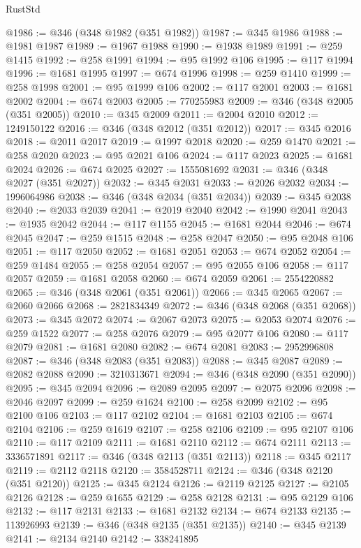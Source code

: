 \begin{lexlean}{RustStd}
\begin{coremodule}
@1986 := @346 (@348 @1982 (@351 @1982))
@1987 := @345 @1986
@1988 := @1981 @1987
@1989 := @1967 @1988
@1990 := @1938 @1989
@1991 := @259 @1415
@1992 := @258 @1991
@1994 := @95 @1992 @106
@1995 := @117 @1994
@1996 := @1681 @1995
@1997 := @674 @1996
@1998 := @259 @1410
@1999 := @258 @1998
@2001 := @95 @1999 @106
@2002 := @117 @2001
@2003 := @1681 @2002
@2004 := @674 @2003
@2005 := 770255983
@2009 := @346 (@348 @2005 (@351 @2005))
@2010 := @345 @2009
@2011 := @2004 @2010
@2012 := 1249150122
@2016 := @346 (@348 @2012 (@351 @2012))
@2017 := @345 @2016
@2018 := @2011 @2017
@2019 := @1997 @2018
@2020 := @259 @1470
@2021 := @258 @2020
@2023 := @95 @2021 @106
@2024 := @117 @2023
@2025 := @1681 @2024
@2026 := @674 @2025
@2027 := 1555081692
@2031 := @346 (@348 @2027 (@351 @2027))
@2032 := @345 @2031
@2033 := @2026 @2032
@2034 := 1996064986
@2038 := @346 (@348 @2034 (@351 @2034))
@2039 := @345 @2038
@2040 := @2033 @2039
@2041 := @2019 @2040
@2042 := @1990 @2041
@2043 := @1935 @2042
@2044 := @117 @1155
@2045 := @1681 @2044
@2046 := @674 @2045
@2047 := @259 @1515
@2048 := @258 @2047
@2050 := @95 @2048 @106
@2051 := @117 @2050
@2052 := @1681 @2051
@2053 := @674 @2052
@2054 := @259 @1484
@2055 := @258 @2054
@2057 := @95 @2055 @106
@2058 := @117 @2057
@2059 := @1681 @2058
@2060 := @674 @2059
@2061 := 2554220882
@2065 := @346 (@348 @2061 (@351 @2061))
@2066 := @345 @2065
@2067 := @2060 @2066
@2068 := 2821834349
@2072 := @346 (@348 @2068 (@351 @2068))
@2073 := @345 @2072
@2074 := @2067 @2073
@2075 := @2053 @2074
@2076 := @259 @1522
@2077 := @258 @2076
@2079 := @95 @2077 @106
@2080 := @117 @2079
@2081 := @1681 @2080
@2082 := @674 @2081
@2083 := 2952996808
@2087 := @346 (@348 @2083 (@351 @2083))
@2088 := @345 @2087
@2089 := @2082 @2088
@2090 := 3210313671
@2094 := @346 (@348 @2090 (@351 @2090))
@2095 := @345 @2094
@2096 := @2089 @2095
@2097 := @2075 @2096
@2098 := @2046 @2097
@2099 := @259 @1624
@2100 := @258 @2099
@2102 := @95 @2100 @106
@2103 := @117 @2102
@2104 := @1681 @2103
@2105 := @674 @2104
@2106 := @259 @1619
@2107 := @258 @2106
@2109 := @95 @2107 @106
@2110 := @117 @2109
@2111 := @1681 @2110
@2112 := @674 @2111
@2113 := 3336571891
@2117 := @346 (@348 @2113 (@351 @2113))
@2118 := @345 @2117
@2119 := @2112 @2118
@2120 := 3584528711
@2124 := @346 (@348 @2120 (@351 @2120))
@2125 := @345 @2124
@2126 := @2119 @2125
@2127 := @2105 @2126
@2128 := @259 @1655
@2129 := @258 @2128
@2131 := @95 @2129 @106
@2132 := @117 @2131
@2133 := @1681 @2132
@2134 := @674 @2133
@2135 := 113926993
@2139 := @346 (@348 @2135 (@351 @2135))
@2140 := @345 @2139
@2141 := @2134 @2140
@2142 := 338241895

\end{coremodule}
\end{lexlean}
